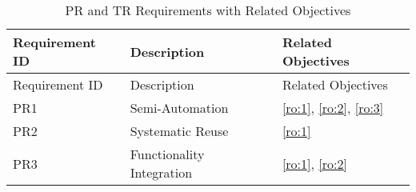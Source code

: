 \hypertarget{tbl:requirements}{}
\begin{longtable}{@{}lll@{}}
\caption{\label{tbl:requirements}PR and TR Requirements with Related Objectives}\tabularnewline
\toprule
\begin{minipage}[b]{0.18\columnwidth}\raggedright
Requirement ID\strut
\end{minipage} & 
\begin{minipage}[b]{0.45\columnwidth}\raggedright
Description\strut
\end{minipage} & 
\begin{minipage}[b]{0.27\columnwidth}\raggedright
Related Objectives\strut
\end{minipage}\tabularnewline
\midrule
\endfirsthead

\toprule
\begin{minipage}[b]{0.18\columnwidth}\raggedright
Requirement ID\strut
\end{minipage} & 
\begin{minipage}[b]{0.45\columnwidth}\raggedright
Description\strut
\end{minipage} & 
\begin{minipage}[b]{0.27\columnwidth}\raggedright
Related Objectives\strut
\end{minipage}\tabularnewline
\midrule
\endhead

\begin{minipage}[t]{0.18\columnwidth}\raggedright
PR1\strut
\end{minipage} & 
\begin{minipage}[t]{0.45\columnwidth}\raggedright
Semi-Automation\strut
\end{minipage} & 
\begin{minipage}[t]{0.27\columnwidth}\raggedright
\cref{ro:1}, \cref{ro:2}, \cref{ro:3}\strut
\end{minipage}\tabularnewline

\begin{minipage}[t]{0.18\columnwidth}\raggedright
PR2\strut
\end{minipage} & 
\begin{minipage}[t]{0.45\columnwidth}\raggedright
Systematic Reuse\strut
\end{minipage} & 
\begin{minipage}[t]{0.27\columnwidth}\raggedright
\cref{ro:1}\strut
\end{minipage}\tabularnewline

\begin{minipage}[t]{0.18\columnwidth}\raggedright
PR3\strut
\end{minipage} & 
\begin{minipage}[t]{0.45\columnwidth}\raggedright
Functionality Integration\strut
\end{minipage} & 
\begin{minipage}[t]{0.27\columnwidth}\raggedright
\cref{ro:1}, \cref{ro:2}\strut
\end{minipage}\tabularnewline


\end{longtable}
